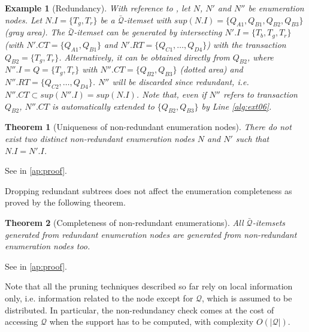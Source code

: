 \documentclass[
]{ceurart}
\newtheorem{theorem}{Theorem}
\newtheorem{example}{Example}
\begin{document}
\begin{example}[Redundancy]
\label{ex:redundancy}
With reference to , let $N$, $N'$ and $N''$ be enumeration nodes.
Let $N.I=\{T_g,T_r\}$ be a $\bar{\mathcal{Q}}$-itemset with $sup(N.I)=\{Q_{A1},Q_{B1},Q_{B2},Q_{B3}\}$ (gray area).
The $\bar{\mathcal{Q}}$-itemset can be generated by intersecting $N'.I=\{T_b,T_g,T_r\}$ (with $N'.CT=\{Q_{A1},Q_{B1}\}$ and $N'.RT=\{Q_{C1},\ldots,Q_{D4}\}$) with the transaction $Q_{B2}=\{T_g,T_r\}$.
Alternatively, it can be obtained directly from $Q_{B2}$, where $N''.I=Q=\{T_g,T_r\}$ with $N''.CT=\{Q_{B2},Q_{B3}\}$ (dotted area) and $N''.RT=\{Q_{C2},\ldots,Q_{D4}\}$.
$N''$ will be discarded since redundant, i.e. $N''.CT \subset sup(N''.I)=sup(N.I)$.
Note that, even if $N''$ refers to transaction $Q_{B2}$, $N''.CT$ is automatically extended to $\{Q_{B2},Q_{B3}\}$ by  Line \ref{alg:ext06}.
\end{example}


\begin{theorem}[Uniqueness of non-redundant enumeration nodes]
There do not exist two distinct non-redundant enumeration nodes $N$ and $N'$ such that $N.I=N'.I$.
\end{theorem}
See  in \ref{ap:proof}.

Dropping redundant %
subtrees does not affect the enumeration completeness as proved by the following theorem.

\begin{theorem}[Completeness of non-redundant enumerations]
All $\bar{\mathcal{Q}}$-itemsets generated from redundant enumeration nodes are generated from non-redundant enumeration nodes too.
\end{theorem}
See  in \ref{ap:proof}.

Note that all the pruning techniques described so far rely on local information only, i.e. information related to the node except for $\mathcal{Q}$, which is assumed to be distributed.
In particular, the non-redundancy check comes at the cost of accessing $\mathcal{Q}$ when the support has to be computed, with complexity $O(|\mathcal{Q}|)$.
\end{document}
